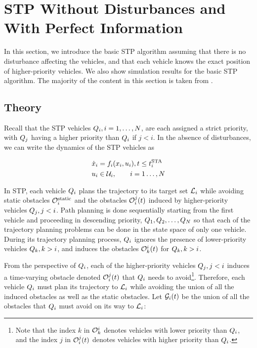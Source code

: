 \section{STP Without Disturbances and With Perfect Information\label{sec:basic}}
In this section, we introduce the basic STP algorithm assuming that there is no disturbance affecting the vehicles, and that each vehicle knows the exact position of higher-priority vehicles.  We also show simulation results for the basic STP algorithm. The majority of the content in this section is taken from \cite{Chen15c}.

\subsection{Theory}
Recall that the STP vehicles $Q_i, i=1,\ldots,N$, are each assigned a strict priority, with $Q_j$ having a higher priority than $Q_i$ if $j<i$. In the absence of disturbances, we can write the dynamics of the STP vehicles as

\begin{equation}
\label{eq:dyn_no_dstb}
\begin{aligned}
\dot\state_i &= \fdyn_i(\state_i, \ctrl_i), t \le \sta_i \\
\ctrl_i &\in \cset_i, \qquad i = 1 \ldots, \N
\end{aligned}
\end{equation}


In STP, each vehicle $Q_i$ plans the trajectory to its target set $\mathcal{L}_i$ while avoiding static obstacles $\mathcal{O}^\text{static}_i$ and the obstacles $\mathcal{O}_i^j(t)$ induced by higher-priority vehicles $Q_j, j<i$. Path planning is done sequentially starting from the first vehicle and proceeding in descending priority, $Q_1, Q_2, \ldots, Q_{N}$ so that each of the trajectory planning problems can be done in the state space of only one vehicle. During its trajectory planning process, $Q_i$ ignores the presence of lower-priority vehicles $Q_k, k>i$, and induces the obstacles $\mathcal{O}_k^i(t)$ for $Q_k, k>i$.

From the perspective of $Q_i$, each of the higher-priority vehicles $Q_j, j<i$ induces a time-varying obstacle denoted $\mathcal{O}_i^j(t)$ that $Q_i$ needs to avoid\footnote{Note that the index $k$ in $\mathcal{O}_k^i$ denotes vehicles with lower priority than $Q_i$, and the index $j$ in $\mathcal{O}_i^j(t)$ denotes vehicles with higher priority than $Q_i$.}. Therefore, each vehicle $Q_i$ must plan its trajectory to $\mathcal{L}_i$ while avoiding the union of all the induced obstacles as well as the static obstacles. Let $\mathcal{G}_i(t)$ be the union of all the obstacles that $Q_i$ must avoid on its way to $\mathcal{L}_i$:

